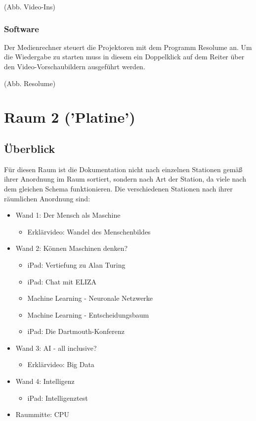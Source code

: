 \documentclass [titlepage,a4paper]{article}
\begin{document}
(Abb. Video-Ins)

\subsubsection{Software}

Der Medienrechner steuert die Projektoren mit dem Programm Resolume an. Um die Wiedergabe zu starten muss in diesem ein Doppelklick auf dem Reiter über den Video-Vorschaubildern ausgeführt werden.

(Abb. Resolume)






\newpage
\section{Raum 2 ('Platine')}

\subsection{Überblick}

Für diesen Raum ist die Dokumentation nicht nach einzelnen Stationen gemäß ihrer Anordnung im Raum sortiert, sondern nach Art der Station, da viele nach dem gleichen Schema funktionieren. Die verschiedenen Stationen nach ihrer räumlichen Anordnung sind: 


\begin{itemize}
    \item Wand 1: Der Mensch als Maschine
        \begin{itemize}
            \item Erklärvideo: Wandel des Menschenbildes
        \end{itemize}

    \item Wand 2: Können Maschinen denken?
        \begin{itemize}
            \item iPad: Vertiefung zu Alan Turing
            \item iPad: Chat mit ELIZA
            \item Machine Learning - Neuronale Netzwerke
            \item Machine Learning - Entscheidungsbaum
            \item iPad: Die Dartmouth-Konferenz
        \end{itemize}

    \item Wand 3: AI - all inclusive?
        \begin{itemize}
            \item Erklärvideo: Big Data 
        \end{itemize}

    \item Wand 4: Intelligenz
        \begin{itemize}
            \item iPad: Intelligenztest
        \end{itemize}

    \item Raummitte: CPU
\end{itemize}
\end{document}
